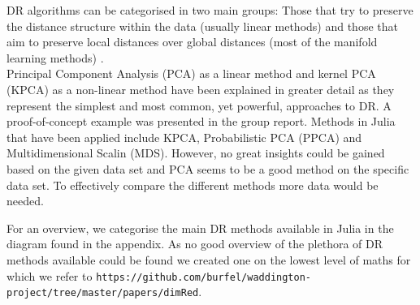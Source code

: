 \documentclass[journal, a4paper]{IEEEtran}
\begin{document}

DR algorithms can be categorised in two main groups: Those that try to preserve the distance structure within the data (usually linear methods) and those that aim to preserve local distances over global distances (most of the manifold learning methods) \cite{umap}.\\


Principal Component Analysis (PCA) as a linear method and kernel PCA (KPCA) as a non-linear method have been explained in greater detail as they represent the simplest and most common, yet powerful, approaches to DR. A proof-of-concept example was presented in the group report. Methods in Julia that have been applied include KPCA, Probabilistic PCA (PPCA) and Multidimensional Scalin (MDS). However, no great insights could be gained based on the given data set and PCA seems to be a good method on the specific data set. To effectively compare the different methods more data would be needed.

For an overview, we categorise the main DR methods available in Julia in the diagram found in the appendix. As no good overview of the plethora of DR methods available could be found we created one on the lowest level of maths for which we refer to \texttt{https://github.com/burfel/waddington-project/tree/master/papers/dimRed}.





\end{document}
